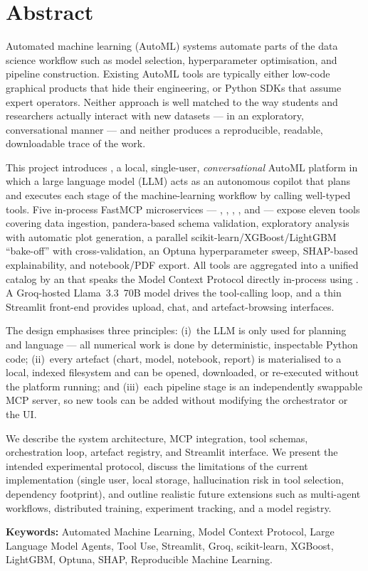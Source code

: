 \chapter*{Abstract}

Automated machine learning (AutoML) systems automate parts of the data
science workflow such as model selection, hyperparameter optimisation, and
pipeline construction. Existing AutoML tools are typically either
low-code graphical products that hide their engineering, or Python SDKs
that assume expert operators. Neither approach is well matched to the way
students and researchers actually interact with new datasets --- in an
exploratory, conversational manner --- and neither produces a
reproducible, readable, downloadable trace of the work.

This project introduces \textbf{\projname}, a local, single-user,
\emph{conversational} AutoML platform in which a large language model
(LLM) acts as an autonomous copilot that plans and executes each stage of
the machine-learning workflow by calling well-typed tools. Five in-process
FastMCP microservices --- , ,
, , and  --- expose
eleven tools covering data ingestion, pandera-based schema validation,
exploratory analysis with automatic plot generation, a parallel
scikit-learn/XGBoost/LightGBM ``bake-off'' with cross-validation, an
Optuna hyperparameter sweep, SHAP-based explainability, and
notebook/PDF export. All tools are aggregated into a unified catalog by
an  that speaks the Model Context Protocol
\citep{mcpSpec2024} directly in-process using .
A Groq-hosted Llama~3.3~70B model \citep{llama3card, groq} drives the
tool-calling loop, and a thin Streamlit front-end \citep{streamlit}
provides upload, chat, and artefact-browsing interfaces.

The design emphasises three principles: (i)~the LLM is only used for
planning and language --- all numerical work is done by deterministic,
inspectable Python code; (ii)~every artefact (chart, model, notebook,
report) is materialised to a local, indexed filesystem and can be
opened, downloaded, or re-executed without the platform running;
and (iii)~each pipeline stage is an independently swappable MCP server,
so new tools can be added without modifying the orchestrator or the UI.

We describe the system architecture, MCP integration, tool schemas,
orchestration loop, artefact registry, and Streamlit interface. We
present the intended experimental protocol, discuss the limitations of
the current implementation (single user, local storage, hallucination
risk in tool selection, dependency footprint), and outline realistic
future extensions such as multi-agent workflows, distributed training,
experiment tracking, and a model registry.

\vspace{0.5cm}
\noindent\textbf{Keywords:} Automated Machine Learning, Model Context
Protocol, Large Language Model Agents, Tool Use, Streamlit, Groq,
scikit-learn, XGBoost, LightGBM, Optuna, SHAP, Reproducible Machine
Learning.

\clearpage
